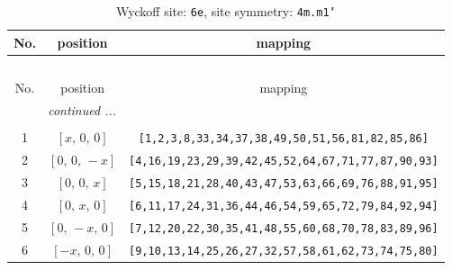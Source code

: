\documentclass[fleqn,8pt]{jsarticle}
\begin{document}
\begin{longtable}{ccc}
\caption{Wyckoff site: {\tt 6e}, site symmetry: {\tt 4m.m1'}}
 \\
 \hline \hline
No. & position & mapping \\ \hline \endfirsthead

\multicolumn{2}{l}{\tablename\ \thetable{}} \\
 \hline \hline
No. & position & mapping \\ \hline \endhead

 \hline \hline
\multicolumn{2}{r}{\footnotesize\it continued ...} \\ \endfoot

 \hline \hline
\multicolumn{2}{r}{} \\ \endlastfoot

1 & $\left[ x,\, 0,\, 0 \right]$ & {\tt [1,2,3,8,33,34,37,38,49,50,51,56,81,82,85,86]} \\ \hline
2 & $\left[ 0,\, 0,\, - x \right]$ & {\tt [4,16,19,23,29,39,42,45,52,64,67,71,77,87,90,93]} \\ \hline
3 & $\left[ 0,\, 0,\, x \right]$ & {\tt [5,15,18,21,28,40,43,47,53,63,66,69,76,88,91,95]} \\ \hline
4 & $\left[ 0,\, x,\, 0 \right]$ & {\tt [6,11,17,24,31,36,44,46,54,59,65,72,79,84,92,94]} \\ \hline
5 & $\left[ 0,\, - x,\, 0 \right]$ & {\tt [7,12,20,22,30,35,41,48,55,60,68,70,78,83,89,96]} \\ \hline
6 & $\left[ - x,\, 0,\, 0 \right]$ & {\tt [9,10,13,14,25,26,27,32,57,58,61,62,73,74,75,80]} \\
\end{longtable}
\renewcommand{\arraystretch}{1.2}
\end{document}
